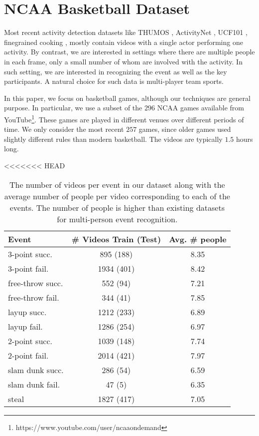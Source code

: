 
\section{NCAA Basketball Dataset}
\label{sec:data}

Most recent activity detection datasets like THUMOS \cite{THUMOS},
ActivityNet \cite{ActivityNet}, UCF101 
\cite{UCF101}, finegrained cooking \cite{Finegrained_cooking},
mostly contain videos with a single actor performing one activity.
By contrast, we are interested in settings where there are multiple
people in each frame, only a small number of whom are involved with
the  activity. In such setting, we are interested in recognizing the event
as well as the key participants. A natural choice for such data is
multi-player team sports.

In this paper, we focus on basketball games, although our techniques
are general purpose.
In particular,  we use a subset of the $296$ NCAA games available from 
YouTube\footnote{https://www.youtube.com/user/ncaaondemand}.  These games are
played in different venues over different periods of time.
We only consider the most recent $257$ games, since older games used
slightly different rules than modern basketball.
The videos are typically $1.5$ hours long.

<<<<<<< HEAD
\begin{table}[ht!]
\begin{center}
\small
 \begin{tabular}{|l|c|c|}
  \hline
  Event          & \# Videos Train (Test) & Avg. \# people \\ \hline \hline
  3-point succ.    & 895 (188) &  8.35 \\ 
  3-point fail.    & 1934 (401) &  8.42 \\ 
  free-throw succ. & 552 (94) &  7.21\\ 
  free-throw fail. & 344 (41) &  7.85\\  
  layup succ.      & 1212 (233) &  6.89\\ 
  layup fail.      & 1286 (254) &  6.97 \\ 
  2-point succ.    & 1039 (148) &  7.74 \\ 
  2-point fail.    & 2014 (421) &  7.97\\ 
  slam dunk succ.  & 286 (54) &  6.59 \\ 
  slam dunk fail.  & 47 (5) &  6.35\\ 
  steal & 1827 (417) & 7.05\\ \hline  
  \end{tabular}
\end{center}
  \caption{The number of videos per event in our dataset along with
  the average number of people per video corresponding to each of the
events. The number of people is higher than existing datasets for
multi-person event recognition.}
  \label{tab:data_dist}
\end{table}



